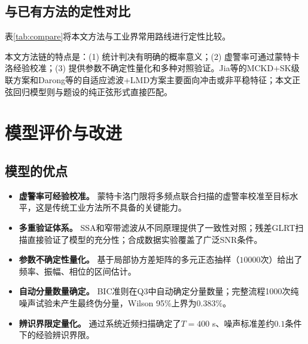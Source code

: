 \documentclass[withoutpreface,bwprint]{cumcmthesis}
\begin{document}
\subsection{与已有方法的定性对比}
表\ref{tab:compare}将本文方法与工业界常用路线进行定性比较。

\begin{table}[!htbp]
\centering
\caption{本文方法与传统方法的综合对比}\label{tab:compare}
\end{table}

\FloatBarrier

本文方法链的特点是：(1) 统计判决有明确的概率意义；(2) 虚警率可通过蒙特卡洛经验校准；(3) 提供参数不确定性量化和多种对照验证。Jia等的MCKD+SK级联方案和Darong等的自适应滤波+LMD方案主要面向冲击或非平稳特征；本文正弦回归模型则与题设的纯正弦形式直接匹配。

\section{模型评价与改进}
\subsection{模型的优点}
\begin{itemize}
    \item [(1)] \textbf{虚警率可经验校准。} 蒙特卡洛门限将多频点联合扫描的虚警率校准至目标水平，这是传统工业方法所不具备的关键能力。
    \item [(2)] \textbf{多重验证体系。} SSA和窄带滤波从不同原理提供了一致性对照；残差GLRT扫描直接验证了模型的充分性；合成数据实验覆盖了广泛SNR条件。
    \item [(3)] \textbf{参数不确定性量化。} 基于局部协方差矩阵的多元正态抽样（$10000$次）给出了频率、振幅、相位的区间估计。
    \item [(4)] \textbf{自动分量数量确定。} BIC准则在Q3中自动确定分量数量；完整流程1000次纯噪声试验未产生最终伪分量，Wilson 95\%上界为$0.383\%$。
    \item [(5)] \textbf{辨识界限定量化。} 通过系统近频扫描确定了$T=400$ s、噪声标准差约$0.1$条件下的经验辨识界限。
\end{itemize}
\end{document}
